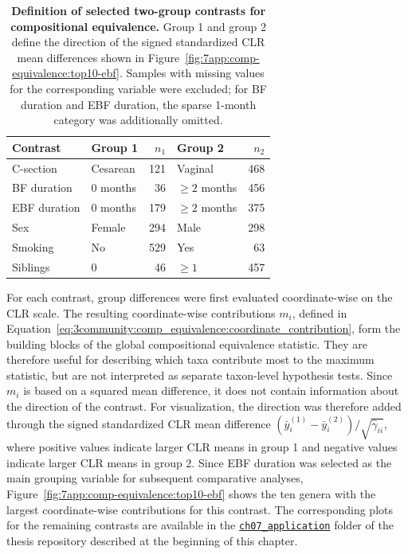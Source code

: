 \begin{table}[H]
\centering
\caption{\textbf{Definition of selected two-group contrasts for compositional equivalence.} Group 1 and group 2 define the direction of the signed standardized CLR mean differences shown in Figure~\ref{fig:7app:comp-equivalence:top10-ebf}. Samples with missing values for the corresponding variable were excluded; for BF duration and EBF duration, the sparse 1-month category was additionally omitted.}
\label{tab:7app:comp-equivalence:contrasts}
\begin{tabular}[t]{llrlr}
\toprule
Contrast     & Group 1  & $n_1$ & Group 2 & $n_2$\\
\midrule
C-section    & Cesarean & 121 & Vaginal & 468\\
BF duration  & 0 months & 36 & $\ge 2$ months & 456\\
EBF duration & 0 months & 179 & $\ge 2$ months & 375\\
Sex          & Female   & 294 & Male & 298\\
Smoking      & No       & 529 & Yes & 63\\
Siblings     & 0        & 46 & $\ge 1$ & 457\\
\bottomrule
\end{tabular}
\end{table}

For each contrast, group differences were first evaluated coordinate-wise on the CLR scale. The resulting coordinate-wise contributions $m_i$, defined in Equation~\ref{eq:3community:comp_equivalence:coordinate_contribution}, form the building blocks of the global compositional equivalence statistic. They are therefore useful for describing which taxa contribute most to the maximum statistic, but are not interpreted as separate taxon-level hypothesis tests. Since $m_i$ is based on a squared mean difference, it does not contain information about the direction of the contrast. For visualization, the direction was therefore added through the signed standardized CLR mean difference $(\bar{y}_i^{(1)}-\bar{y}_i^{(2)})/\sqrt{\hat{\gamma}_{ii}}$, where positive values indicate larger CLR means in group 1 and negative values indicate larger CLR means in group 2. Since EBF duration was selected as the main grouping variable for subsequent comparative analyses, Figure~\ref{fig:7app:comp-equivalence:top10-ebf} shows the ten genera with the largest coordinate-wise contributions for this contrast. The corresponding plots for the remaining contrasts are available in the \href{https://github.com/stefpeschel/phd_thesis/tree/main/ch07_application}{\texttt{ch07\_application}} folder of the thesis repository described at the beginning of this chapter.

